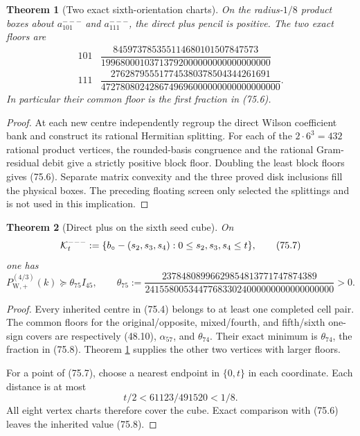 \documentclass[11pt,oneside]{article}
\newtheorem{theorem}{Theorem}[section]
\theoremstyle{definition}
\theoremstyle{remark}
\begin{document}
\begin{theorem}[Two exact sixth-orientation charts]
\label{thm:newv75-two-charts}
On the radius-\(1/8\) product boxes about \(a^{---}_{101}\) and
\(a^{---}_{111}\), the direct plus pencil is positive.  The two
exact floors are
\[
\begin{array}{c|c}
101&
\dfrac{845973785355114680101507847573}
 {19968000103713792000000000000000000}\\[6pt]
111&
\dfrac{276287955517745380378504344261691}
 {4727808024286749696000000000000000000}.
\end{array}                                             \tag{75.6}
\]
In particular their common floor is the first fraction in (75.6).
\end{theorem}

\begin{proof}
At each new centre independently regroup the direct Wilson
coefficient bank and construct its rational Hermitian splitting.
For each of the \(2\cdot6^3=432\) rational product vertices, the
rounded-basis congruence and the rational Gram-residual debit give a
strictly positive block floor.  Doubling the least block floors
gives (75.6).  Separate matrix convexity and the three proved disk
inclusions fill the physical boxes.  The preceding floating screen
only selected the splittings and is not used in this implication.
\end{proof}

\begin{theorem}[Direct plus on the sixth seed cube]
\label{thm:newv75-seed-cube}
On
\[
 {\cal K}^{---}_t:=
 \{b_\circ-(s_2,s_3,s_4):0\le s_2,s_3,s_4\le t\},      \tag{75.7}
\]
one has
\[
 P_{\mathrm W,+}^{(4/3)}(k)
 \succeq\theta_{75}I_{45},\qquad
 \theta_{75}:=
 \frac{23784808996629854813771747874389}
 {241558005344776833024000000000000000000}>0.          \tag{75.8}
\]
\end{theorem}

\begin{proof}
Every inherited centre in (75.4) belongs to at least one completed
cell pair.  The common floors for the original/opposite,
mixed/fourth, and fifth/sixth one-sign covers are respectively
(48.10), \(\alpha_{57}\), and \(\theta_{74}\).  Their exact minimum
is \(\theta_{74}\), the fraction in (75.8).  Theorem
\ref{thm:newv75-two-charts} supplies the other two vertices with
larger floors.

For a point of (75.7), choose a nearest endpoint in \(\{0,t\}\) in
each coordinate.  Each distance is at most
\[
 t/2<61123/491520<1/8.                                 \tag{75.9}
\]
All eight vertex charts therefore cover the cube.  Exact comparison
with (75.6) leaves the inherited value (75.8).
\end{proof}
\end{document}
